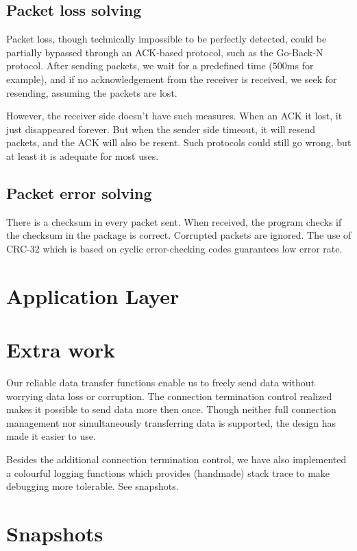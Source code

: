 \documentclass[10pt,a4paper]{article}
\begin{document}
    \subsection{Packet loss solving}
        Packet loss, though technically impossible to be perfectly detected, could be partially bypassed through an ACK-based protocol, such as the Go-Back-N protocol. After sending packets, we wait for a predefined time ($500$ms for example), and if no acknowledgement from the receiver is received, we seek for resending, assuming the packets are lost.

       	However, the receiver side doesn't have such measures. When an ACK it lost, it just disappeared forever. But when the sender side timeout, it will resend packets, and the ACK will also be resent. Such protocols could still go wrong, but at least it is adequate for most uses.
    \subsection{Packet error solving}
        There is a checksum in every packet sent. When received, the program checks if the checksum in the package is correct. Corrupted packets are ignored. The use of CRC-32 which is based on cyclic error-checking codes guarantees low error rate.

\section{Application Layer}
\section{Extra work}

    Our reliable data transfer functions enable us to freely send data without worrying data loss or corruption. The connection termination control realized makes it possible to send data more then once. Though neither full connection management nor simultaneously transferring data is supported, the design has made it easier to use.

    Besides the additional connection termination control, we have also implemented a colourful logging functions which provides (handmade) stack trace to make debugging more tolerable. See snapshots. 
\section{Snapshots}
\end{document}
